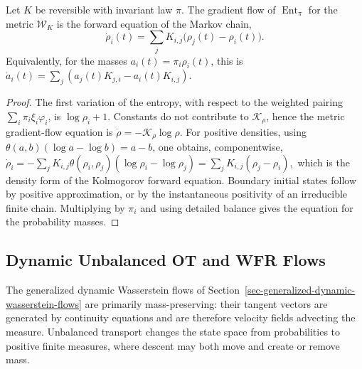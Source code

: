 \begin{prop}
\label{prop-discrete-markov-entropy-gradient}
Let \(K\) be reversible with invariant law \(\pi\). The gradient flow of \(\operatorname{Ent}_\pi\) for the metric \(\mathcal W_K\) is the forward equation of the Markov chain,
\begin{equation}
\label{eq-discrete-markov-gradient-flow}
\dot\rho_i(t)=\sum_jK_{i,j}\bigl(\rho_j(t)-\rho_i(t)\bigr).
\end{equation}
Equivalently, for the masses \(a_i(t)=\pi_i\rho_i(t)\), this is \(\dot a_i(t)=\sum_j(a_j(t)K_{j,i}-a_i(t)K_{i,j})\).
\end{prop}
\begin{proof}
The first variation of the entropy, with respect to the weighted pairing \(\sum_i\pi_i\xi_i\varphi_i\), is \(\log\rho_i+1\). Constants do not contribute to \(\mathcal K_\rho\), hence the metric gradient-flow equation is
\(\dot\rho=-\mathcal K_\rho\log\rho\).
For positive densities, using
\(\theta(a,b)(\log a-\log b)=a-b\),
one obtains, componentwise, \(\dot\rho_i =-\sum_jK_{i,j}\theta(\rho_i,\rho_j)(\log\rho_i-\log\rho_j) = \sum_jK_{i,j}(\rho_j-\rho_i),\)
which is the density form of the Kolmogorov forward equation. Boundary initial states follow by positive approximation, or by the instantaneous positivity of an irreducible finite chain. Multiplying by \(\pi_i\) and using detailed balance gives the equation for the probability masses.
\end{proof}
\subsection{Dynamic Unbalanced OT and WFR Flows}
\label{sec-dynamic-unbalanced-wfr-flows}
\label{sec-wfr-gradient-flows}
The generalized dynamic Wasserstein flows of Section~\ref{sec-generalized-dynamic-wasserstein-flows} are primarily mass-preserving: their tangent vectors are generated by continuity equations and are therefore velocity fields advecting the measure. Unbalanced transport changes the state space from probabilities to positive finite measures, where descent may both move and create or remove mass.

